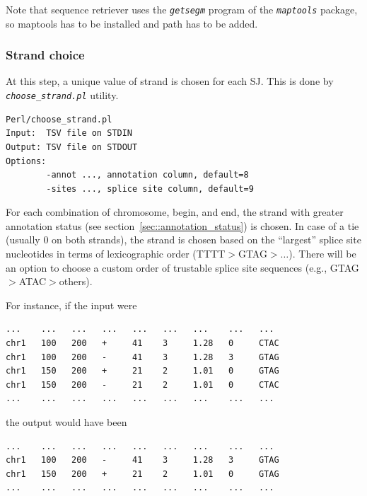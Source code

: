 \documentclass{article}
\newcommand{\prog}[1]{{\tt\em #1}}
\begin{document}
Note that sequence retriever uses the \prog{getsegm} program of the \prog{maptools} package, so maptools has to be installed and path has to be added.


\subsubsection{Strand choice}
At this step, a unique value of strand is chosen for each SJ. This is done by \prog{choose\_strand.pl} utility. 
\begin{verbatim}
Perl/choose_strand.pl
Input:  TSV file on STDIN
Output: TSV file on STDOUT
Options:
        -annot ..., annotation column, default=8
        -sites ..., splice site column, default=9
\end{verbatim}
For each combination of chromosome, begin, and end, the strand with greater annotation status (see section~\ref{sec::annotation_status}) is chosen. In case of 
a tie (usually $0$ on both strands), the strand is chosen based on the ``largest'' splice site nucleotides in terms of lexicographic order (TTTT$>$GTAG$>\dots$).
There will be an option to choose a custom order of trustable splice site sequences (e.g., GTAG$>$ATAC$>$others).

For instance, if the input were
\begin{verbatim}
...    ...   ...   ...   ...   ...   ...    ...   ...
chr1   100   200   +     41    3     1.28   0     CTAC
chr1   100   200   -     41    3     1.28   3     GTAG
chr1   150   200   +     21    2     1.01   0     GTAG
chr1   150   200   -     21    2     1.01   0     CTAC
...    ...   ...   ...   ...   ...   ...    ...   ...
\end{verbatim}
the output would have been 
\begin{verbatim}
...    ...   ...   ...   ...   ...   ...    ...   ...
chr1   100   200   -     41    3     1.28   3     GTAG
chr1   150   200   +     21    2     1.01   0     GTAG
...    ...   ...   ...   ...   ...   ...    ...   ...
\end{verbatim}

\end{document}
